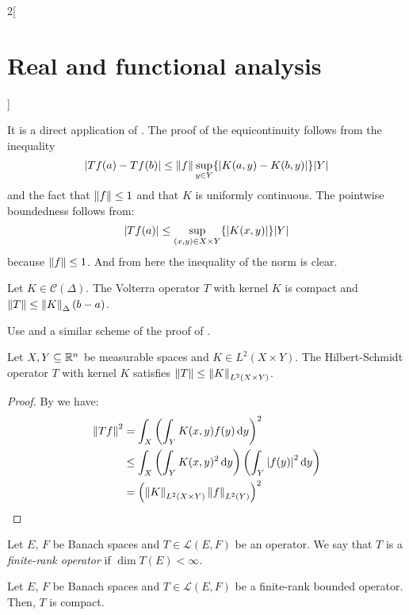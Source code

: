 \documentclass[../../../main_math.tex]{subfiles}
\begin{document}
\begin{multicols}{2}[\section{Real and functional analysis}]
\begin{proposition}
  \end{proposition}
  \begin{sproof}
    It is a direct application of . The proof of the equicontinuity follows from the inequality
    $$\abs{Tf(a)-Tf(b)}\leq \left\|f\right\|\sup_{y\in Y}\{\abs{K(a,y)-K(b,y)}\}\abs{Y}$$
    and the fact that $\left\|f\right\|\leq 1$ and that $K$ is uniformly continuous. The pointwise boundedness follows from:
    $$\abs{Tf(a)}\leq\sup_{(x,y)\in X\times Y}\{\abs{K(x,y)}\}\abs{Y}$$
    because $\left\|f\right\|\leq 1$.
    And from here the inequality of the norm is clear.
  \end{sproof}
  \begin{proposition}
    Let $K\in\mathcal{C}(\Delta)$. The Volterra operator $T$ with kernel $K$ is compact and $\left\|T\right\|\leq\left\|K\right\|_{\Delta}(b-a)$.
  \end{proposition}
  \begin{sproof}
    Use  and a similar scheme of the proof of .
  \end{sproof}
  \begin{proposition}
    Let $X,Y\subseteq \mathbb{R}^n$ be measurable spaces and $K\in L^2(X\times Y)$. The Hilbert-Schmidt operator $T$ with kernel $K$ satisfies $\left\|T\right\|\leq\left\|K\right\|_{L^2(X\times Y)}$.
  \end{proposition}
  \begin{proof}
    By  we have:
    \begin{align*}
      \left\|Tf\right\|^2 & =\int_X{\left(\int_YK(x,y)f(y)\dd{y}\right)}^2                                    \\
                  & \leq \int_X\left(\int_YK(x,y)^2\dd{y}\right)\left(\int_Y\abs{f(y)}^2\dd{y}\right) \\
                  & = {\left(\left\|K\right\|_{L^2(X\times Y)}\left\|f\right\|_{L^2(Y)}\right)}^2
    \end{align*}
  \end{proof}
  \begin{definition}
    Let $E$, $F$ be Banach spaces and $T\in\mathcal{L}(E,F)$ be an operator. We say that $T$ is a \emph{finite-rank operator} if $\dim T(E)<\infty$.
  \end{definition}
  \begin{lemma}\label{RFA:lemmarank}
    Let $E$, $F$ be Banach spaces and $T\in\mathcal{L}(E,F)$ be a finite-rank bounded operator. Then, $T$ is compact.
  \end{lemma}
  \begin{sproof}

\end{sproof}
\end{multicols}
\end{document}
